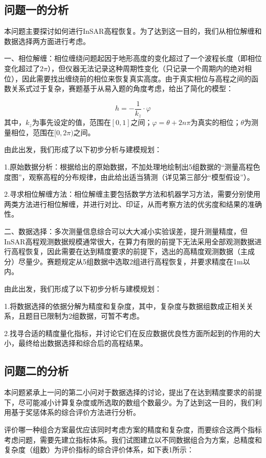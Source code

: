 \documentclass[a4paper]{article}
\begin{document}
	\subsection{问题一的分析}

	本问题主要探讨如何进行InSAR高程恢复。为了达到这一目的，我们从相位解缠和数据选择两方面进行考虑。\par
	一、相位解缠：相位缠绕问题起因于地形高度的变化超过了一个波程长度（即相位变化超过了$ 2\pi $），但仪器无法记录这种周期性变化（只记录一个周期内的绝对相位），因此需要找出缠绕前的相位来恢复真实高度。由于真实相位与高程之间的函数关系式过于复杂，赛题基于从易入题的角度考虑，给出了简化的模型：\par
	\begin{equation}
		h = -\frac{1}{k_z} \cdot \varphi
	\end{equation}
	其中，$ k_z $为事先设定的值，范围在$ [0,1] $之间；$ \varphi = \theta + 2n\pi $为真实的相位；$ \theta $为测量相位，范围在$ [0,2\pi) $之间。\par
	由此出发，我们形成了以下初步分析与建模规划：\par
	1.原始数据分析：根据给出的原始数据，不加处理地绘制出5组数据的“测量高程色度图”，观察高程的分布规律，由此给出适当猜测（详见第三部分“模型假设”）。\par
	2.寻求相位解缠方法：相位解缠主要包括数学方法和机器学习方法，需要分别使用两类方法进行相位解缠，并进行对比、印证，从而考察方法的优劣度和结果的准确性。\par
	二、数据选择：多次测量信息综合可以大大减小实验误差，提升测量精度，但InSAR高程观测数据规模通常很大，在算力有限的前提下无法采用全部观测数据进行高程恢复，因此需要在达到精度要求的前提下，选出的高精度观测数据（主成分）尽量少。赛题规定从5组数据中选取2组进行高程恢复，并要求精度在1m以内。\par
	由此出发，我们形成了以下初步分析与建模规划：\par
	1.将数据选择的依据分解为精度和复杂度，其中，复杂度与数据组数成正相关关系，且题目已限制为2组数据，可暂不考虑。\par
	2.找寻合适的精度量化指标，并讨论它们在反应数据优良性方面所起到的作用的大小，最终给出数据选择和综合后的高程结果。\par

	\subsection{问题二的分析}

	本问题紧承上一问的第二小问对于数据选择的讨论，提出了在达到精度要求的前提下，尽可能减小计算复杂度或所选取的数组个数最少。为了达到这一目的，我们利用基于奖惩体系的综合评价方法进行分析。\par
	评价哪一种组合方案最优应该同时考虑方案的精度和复杂度，而要综合这两个指标考虑问题，需要先建立指标体系。我们试图建立以不同数据组合为方案，总精度和复杂度（组数）为评价指标的综合评价体系，如下表1所示：\par
	
\end{document}
